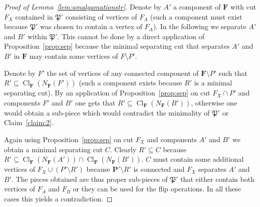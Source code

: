 \documentclass{elsarticle}
\def\Cl{\mathop{\mathrm{Cl}}\nolimits}
\def\str#1{\mathbf {#1}}
\def\Piece{{\mathfrak P}}
\theoremstyle{plain}
\theoremstyle{definition}
\theoremstyle{remark}
\begin{document}
\begin{proof}[Proof of Lemma~\ref{lem:amalgamationstr}]
Denote by $A'$ a component of $\str{F}$ with cut $F_X$ contained in $\Piece'$ consisting of vertices of $F_A$ (such a component must exist because $\Piece'$ was chosen to contain a vertex of $F_A$).
In the following we separate $A'$ and $B'$ within $\Piece'$. This cannot be done by a direct application of
Proposition~\ref{prop:sep} because the minimal separating cut that separates $A'$ and $B'$ in $\str{F}$ may 
contain some vertices of $F\setminus P'$.

Denote by $F'$ the set of vertices of any connected component of $\str{F}\setminus P'$ such that $R'\subseteq \Cl_\str{F}(N_\str{F}(F'))$ (such a component exists because $R'$ is a minimal separating cut). 
By an application of Proposition~\ref{prop:sep} on cut $F_X\cap P'$ and components $F'$
and $B'$ one gets that $R'\subseteq \Cl_\str{F}(N_{\str{F}}(B'))$, otherwise one would obtain
a sub-piece which would contradict the minimality of $\Piece'$ or Claim~\ref{claim:2}.


Again using Proposition~\ref{prop:sep} on cut $F_X$ and
components $A'$ and $B'$ we obtain a minimal separating cut $C$. Clearly $R'\subseteq C$ because $R'\subseteq \Cl_\str{F}(N_\str{F}(A'))\cap \Cl_\str{F}(N_\str{F}(B'))$. $C$ must contain some additional vertices of $F_X\cup (P'\setminus R')$ because $\str{P}'\setminus R'$ is connected and $F_X$ separates $A'$ and $B'$. The pieces obtained are thus proper sub-pieces
of $\Piece'$ that either contain both vertices of $F_A$ and $F_B$ or they can be used for the flip operations. 
In all these cases this yields a contradiction.
\end{proof}
\end{document}
